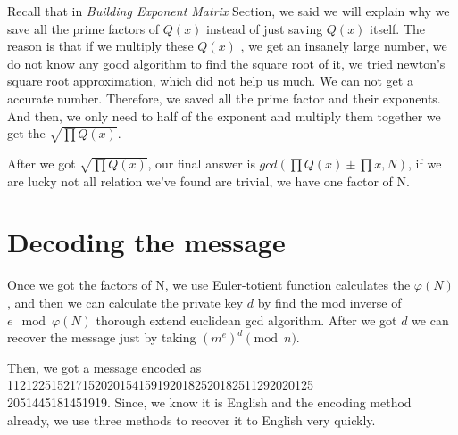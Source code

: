 \documentclass[12pt]{article} %
\begin{document}
\begin{enumerate}
Recall that in \textit{Building Exponent Matrix} Section, we said we will explain why we save all the prime factors of $Q(x)$ instead of just saving $Q(x)$ itself. The reason is that if we multiply these $Q(x)$ , we get an insanely large number, we do not know any good algorithm to find the square root of it, we tried newton's square root approximation, which did not help us much. We can not get a accurate number. Therefore, we saved all the prime factor and their exponents. And then, we only need to half of the exponent and multiply them together we get the $\sqrt{\prod Q(x)}$. 

After we got $\sqrt{\prod Q(x)}$, our final answer is $gcd\left(\prod Q(x) \pm \prod x, N\right)$, if we are lucky not all relation we've found are trivial, we have one factor of N.

\end{enumerate}

\section {Decoding the message}

Once we got the factors of N, we use Euler-totient function calculates the $\varphi(N)$, and then we can calculate the private key $d$ by find the mod inverse of $e \mod{\varphi(N)}$ thorough extend euclidean gcd algorithm. After we got $d$ we can recover the message just by taking $(m^e)^d \pmod{n}$. 

Then, we got a message encoded as 1121225152171520201541591920182520182511292020125\\2051445181451919. Since, we know it is English and the encoding method already, we use three methods to recover it to English very quickly. 
\end{document}
